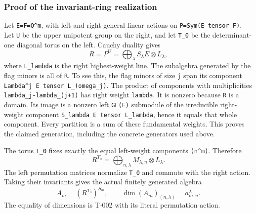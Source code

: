 \documentclass[
  10pt,
]{article}
\begin{document}
\subsubsection{Proof of the invariant-ring
realization}\label{proof-of-the-invariant-ring-realization}

Let \texttt{\small E=\allowbreak{}F=\allowbreak{}Q\textasciicircum{}m},
with left and right general linear actions on
\texttt{\small P=\allowbreak{}Sym(\allowbreak{}E tensor F)\allowbreak{}}.
Let \texttt{\small U} be the upper unipotent group on the right, and let
\texttt{\small T\_\allowbreak{}0} be the determinant-one diagonal torus
on the left. Cauchy duality gives \[
R=P^U=\bigoplus_\lambda S_\lambda E\otimes L_\lambda,
\tag{G9.6}
\] where \texttt{\small L\_\allowbreak{}lambda} is the right
highest-weight line. The subalgebra generated by the flag minors is all
of \texttt{\small R}. To see this, the flag minors of size
\texttt{\small j} span its component
\texttt{\small Lambda\textasciicircum{}j E tensor L\_\allowbreak{}(\allowbreak{}omega\_\allowbreak{}j)\allowbreak{}}.
The product of components with multiplicities
\texttt{\small lambda\_\allowbreak{}j-\allowbreak{}lambda\_\allowbreak{}(\allowbreak{}j+\allowbreak{}1)\allowbreak{}}
has right weight \texttt{\small lambda}. It is nonzero because
\texttt{\small R} is a domain. Its image is a nonzero left
\texttt{\small GL(\allowbreak{}E)\allowbreak{}} submodule of the
irreducible right-weight component
\texttt{\small S\_\allowbreak{}lambda E tensor L\_\allowbreak{}lambda},
hence it equals that whole component. Every partition is a sum of these
fundamental weights. This proves the claimed generation, including the
concrete generators used above.

The torus \texttt{\small T\_\allowbreak{}0} fixes exactly the equal
left-weight components
\texttt{\small (\allowbreak{}n\textasciicircum{}m)\allowbreak{}}.
Therefore \[
R^{T_0}=\bigoplus_{n,\lambda}
M_{\lambda,n}\otimes L_\lambda.
\tag{G9.7}
\] The left permutation matrices normalize
\texttt{\small T\_\allowbreak{}0} and commute with the right action.
Taking their invariants gives the actual finitely generated algebra \[
A_m=(R^{T_0})^{S_m},\qquad
\dim(A_m)_{(n,\lambda)}=a_{m,n}^{\lambda}.
\tag{G9.8}
\] The equality of dimensions is T-002 with its literal permutation
action.
\end{document}
